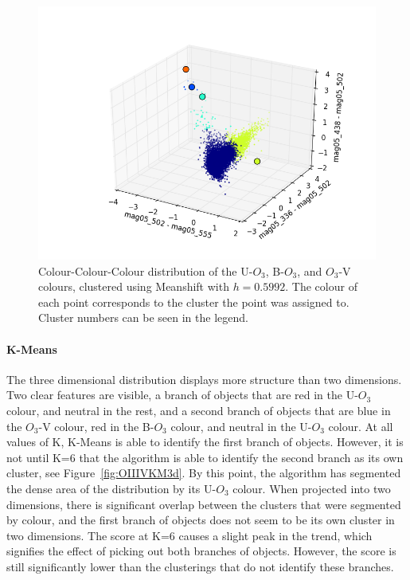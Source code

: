 \begin{figure}
\centering
\includegraphics[width=\linewidth]{figs/meanshift_3d_color_5cl_mag05_502-mag05_555vsmag05_336-mag05_502vsmag05_438-mag05_502}
\caption{Colour-Colour-Colour distribution of the U-$O_{3}$, B-$O_{3}$, and $O_{3}$-V colours, clustered using Meanshift with $h=0.5992$. The colour of each point corresponds to the cluster the point was assigned to. Cluster numbers can be seen in the legend.}
\label{fig:fig:OIIIVMS3d}
\end{figure}

\paragraph{K-Means}
The three dimensional distribution displays more structure than two dimensions.
Two clear features are visible, a branch of objects that are red in the U-$O_{3}$ colour, and neutral in the rest, and a second branch of objects that are blue in the $O_{3}$-V colour, red in the B-$O_{3}$ colour, and neutral in the U-$O_{3}$ colour.
At all values of K, K-Means is able to identify the first branch of objects. However, it is not until K=6 that the algorithm is able to identify the second branch as its own cluster, see Figure~\ref{fig:OIIIVKM3d}.
By this point, the algorithm has segmented the dense area of the distribution by its U-$O_{3}$ colour.
When projected into two dimensions, there is significant overlap between the clusters that were segmented by colour, and the first branch of objects does not seem to be its own cluster in two dimensions.
The score at K=6 causes a slight peak in the trend, which signifies the effect of picking out both branches of objects. However, the score is still significantly lower than the clusterings that do not identify these branches.

